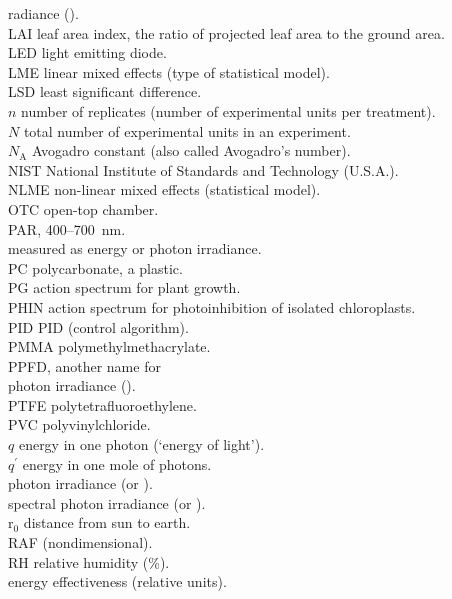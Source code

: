 \begin{tabbing}
\rad   \> radiance (\wattsr).\\
LAI \> leaf area index, the ratio of projected leaf area to the ground area.\\
LED \> light emitting diode.\\
LME \> linear mixed effects (type of statistical model).\\
LSD \> least significant difference.\\
$n$ \> number of replicates (number of experimental units per treatment).\\
$N$ \> total number of experimental units in an experiment.\\
$N_\mathrm{A}$ \> Avogadro constant (also called Avogadro's number).\\
NIST \> National Institute of Standards and Technology (U.S.A.).\\
NLME \> non-linear mixed effects (statistical model).\\
OTC \> open-top chamber.\\
\PAR  \> \gls{PAR}, 400--700~nm.\\
      \> measured as energy or photon irradiance.\\
PC \> polycarbonate, a plastic.\\
PG \> \UV action spectrum for plant growth.\\
PHIN \> \UV action spectrum for photoinhibition of isolated chloroplasts.\\
PID \> \gls{PID} (control algorithm).\\
PMMA  \> polymethylmethacrylate.\\
\PPFD \> \gls{PPFD}, another name for\\
      \> \PAR photon irradiance (\pfd[PAR]).\\
PTFE  \> polytetrafluoroethylene.\\
PVC  \> polyvinylchloride.\\
$q$ \> energy in one photon (`energy of light').\\
$q^\prime$ \> energy in one mole of photons.\\
\pfd  \> photon irradiance (\molms or \umol).\\
\spfd \> spectral photon irradiance (\molnm or \umolnm).\\
r$_0$ \> distance from sun to earth.\\
\RAF \> \gls{RAF} (nondimensional).\\
RH \> relative humidity (\%).\\
\eeff   \> energy effectiveness (relative units).\\

\end{tabbing}
